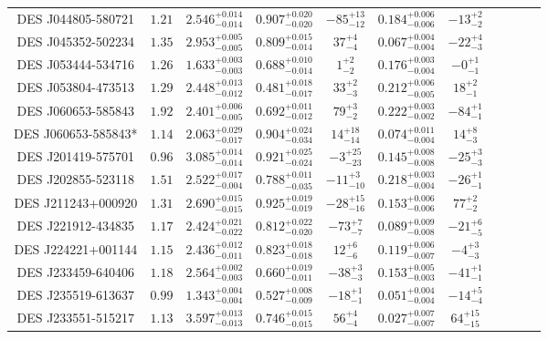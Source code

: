 \documentclass[tradiabstract,twocolumn]{aa}
\begin{document}
{\begin{longtable}{c c c c c c c c c c c}
DES J044805-580721 &           $1.21$ & $2.546^{+0.014}_{-0.014}$ & $0.907^{+0.020}_{-0.020}$ & $-85^{+13}_{-12}$ & $0.184^{+0.006}_{-0.006}$ &   $-13^{+2}_{-2}$ \\
DES J045352-502234 &           $1.35$ & $2.953^{+0.005}_{-0.005}$ & $0.809^{+0.015}_{-0.014}$ &    $37^{+4}_{-4}$ & $0.067^{+0.004}_{-0.004}$ &   $-22^{+4}_{-3}$ \\
DES J053444-534716 &           $1.26$ & $1.633^{+0.003}_{-0.003}$ & $0.688^{+0.010}_{-0.014}$ &     $1^{+2}_{-2}$ & $0.176^{+0.003}_{-0.004}$ &    $-0^{+1}_{-1}$ \\
DES J053804-473513 &           $1.29$ & $2.448^{+0.013}_{-0.012}$ & $0.481^{+0.018}_{-0.017}$ &    $33^{+2}_{-3}$ & $0.212^{+0.006}_{-0.005}$ &    $18^{+2}_{-1}$ \\
DES J060653-585843 &           $1.92$ & $2.401^{+0.006}_{-0.005}$ & $0.692^{+0.011}_{-0.012}$ &    $79^{+3}_{-2}$ & $0.222^{+0.003}_{-0.002}$ &   $-84^{+1}_{-1}$ \\
DES J060653-585843* &          $1.14$ & $2.063^{+0.029}_{-0.017}$ & $0.904^{+0.024}_{-0.034}$ &  $14^{+18}_{-14}$ & $0.074^{+0.011}_{-0.004}$ &    $14^{+8}_{-3}$ \\
DES J201419-575701 &           $0.96$ & $3.085^{+0.014}_{-0.014}$ & $0.921^{+0.025}_{-0.024}$ &  $-3^{+25}_{-23}$ & $0.145^{+0.008}_{-0.008}$ &   $-25^{+3}_{-3}$ \\
DES J202855-523118 &           $1.51$ & $2.522^{+0.017}_{-0.004}$ & $0.788^{+0.011}_{-0.035}$ &  $-11^{+3}_{-10}$ & $0.218^{+0.003}_{-0.004}$ &   $-26^{+1}_{-1}$ \\
DES J211243+000920 &           $1.31$ & $2.690^{+0.015}_{-0.015}$ & $0.925^{+0.019}_{-0.019}$ & $-28^{+15}_{-16}$ & $0.153^{+0.006}_{-0.006}$ &    $77^{+2}_{-2}$ \\
DES J221912-434835 &           $1.17$ & $2.424^{+0.021}_{-0.022}$ & $0.812^{+0.022}_{-0.020}$ &   $-73^{+7}_{-7}$ & $0.089^{+0.009}_{-0.008}$ &   $-21^{+6}_{-5}$ \\
DES J224221+001144 &           $1.15$ & $2.436^{+0.012}_{-0.011}$ & $0.823^{+0.018}_{-0.018}$ &    $12^{+6}_{-6}$ & $0.119^{+0.006}_{-0.007}$ &    $-4^{+3}_{-3}$ \\
DES J233459-640406 &           $1.18$ & $2.564^{+0.002}_{-0.003}$ & $0.660^{+0.019}_{-0.011}$ &   $-38^{+3}_{-3}$ & $0.153^{+0.005}_{-0.003}$ &   $-41^{+1}_{-1}$ \\
DES J235519-613637 &           $0.99$ & $1.343^{+0.004}_{-0.004}$ & $0.527^{+0.008}_{-0.009}$ &   $-18^{+1}_{-1}$ & $0.051^{+0.004}_{-0.004}$ &   $-14^{+5}_{-4}$ \\
DES J233551-515217 &           $1.13$ & $3.597^{+0.013}_{-0.013}$ & $0.746^{+0.015}_{-0.015}$ &    $56^{+4}_{-4}$ & $0.027^{+0.007}_{-0.007}$ &  $64^{+15}_{-15}$ \\
\end{longtable}
\renewcommand*{\arraystretch}{1.}
}
\end{document}
